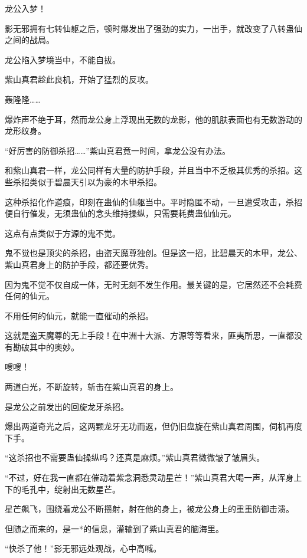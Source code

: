 
\begin{this_body}

龙公入梦！

影无邪拥有七转仙躯之后，顿时爆发出了强劲的实力，一出手，就改变了八转蛊仙之间的战局。

龙公陷入梦境当中，不能自拔。

紫山真君趁此良机，开始了猛烈的反攻。

轰隆隆……

爆炸声不绝于耳，然而龙公身上浮现出无数的龙影，他的肌肤表面也有无数游动的龙形纹身。

“好厉害的防御杀招……”紫山真君竟一时间，拿龙公没有办法。

和紫山真君一样，龙公同样有大量的防护手段，并且当中不乏极其优秀的杀招。这些杀招类似于碧晨天引以为豪的木甲杀招。

这种杀招化作道痕，印刻在蛊仙的仙躯当中。平时隐匿不动，一旦遭受攻击，杀招便自行催发，无须蛊仙的念头维持操纵，只需要耗费蛊仙仙元。

这点有点类似于方源的鬼不觉。

鬼不觉也是顶尖的杀招，由盗天魔尊独创。但是这一招，比碧晨天的木甲，龙公、紫山真君身上的防护手段，都还要优秀。

因为鬼不觉不仅自成一体，无时无刻不发生作用。最关键的是，它居然还不会耗费任何的仙元。

不用任何的仙元，就能一直催动的杀招。

这就是盗天魔尊的无上手段！在中洲十大派、方源等等看来，匪夷所思，一直都没有勘破其中的奥妙。

嗖嗖！

两道白光，不断旋转，斩击在紫山真君的身上。

是龙公之前发出的回旋龙牙杀招。

爆出两道奇光之后，这两颗龙牙无功而返，但仍旧盘旋在紫山真君周围，伺机再度下手。

“这杀招也不需要蛊仙操纵吗？还真是麻烦。”紫山真君微微皱了皱眉头。

“不过，好在我一直都在催动着紫念洞悉灵动星芒！”紫山真君大喝一声，从浑身上下的毛孔中，绽射出无数星芒。

星芒飙飞，围绕着龙公不断攒射，射在他的身上，被龙公身上的重重防御击溃。

但随之而来的，是一*的信息，灌输到了紫山真君的脑海里。

“快杀了他！”影无邪远处观战，心中高喊。


\end{this_body}
